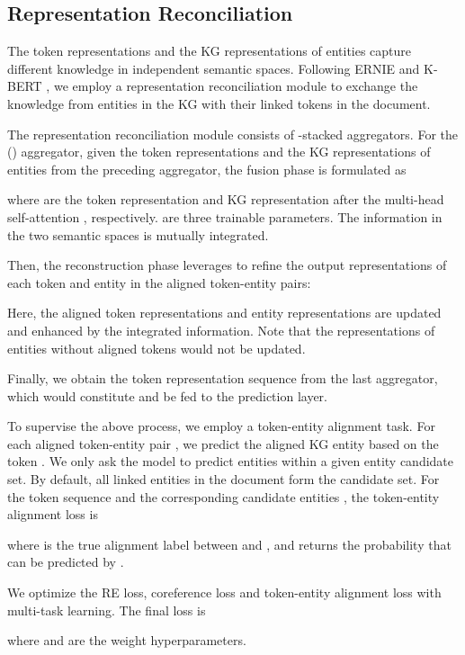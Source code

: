 \documentclass[runningheads]{llncs}
\begin{document}
\subsection{Representation Reconciliation}
\label{subsect:aggr}

The token representations and the KG representations of entities capture different knowledge in independent semantic spaces. 
Following ERNIE \cite{zhang2019ernie} and K-BERT \cite{liu2020kbert}, we employ a representation reconciliation module to exchange the knowledge from entities in the KG with their linked tokens in the document.

The representation reconciliation module consists of -stacked aggregators. 
For the  () aggregator, given the token representations   and the KG representations of entities  from the preceding aggregator, the fusion phase is formulated as

where  are the token representation and KG representation after the multi-head self-attention \cite{vaswani2017attention}, respectively. 
 are three trainable parameters.
The information in the two semantic spaces is mutually integrated.

Then, the reconstruction phase leverages  to refine the output representations of each token and entity in the aligned token-entity pairs:

Here, the aligned token representations and entity representations are updated and enhanced by the integrated information.
Note that the representations of entities without aligned tokens would not be updated.

Finally, we obtain the token representation sequence  from the last aggregator, which would constitute  and be fed to the prediction layer. 

To supervise the above process, we employ a token-entity alignment task. 
For each aligned token-entity pair , we predict the aligned KG entity  based on the token . 
We only ask the model to predict entities within a given entity candidate set. 
By default, all linked entities in the document form the candidate set. 
For the token sequence   and the corresponding candidate entities  , the token-entity alignment loss is

where  is the true alignment label between  and , and  returns the probability that  can be predicted by .

We optimize the RE loss, coreference loss and token-entity alignment loss with multi-task learning. 
The final loss is

where  and  are the weight hyperparameters.
\end{document}

